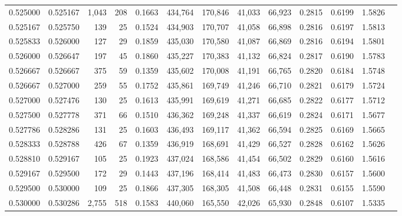 \begin{tabular}{rrrrrrrrrrrrr}
0.525000 & 0.525167 & 1,043 & 208 &                                     0.1663 & 434,764 & 170,846 &  41,033 &  66,923 & 0.2815 & 0.6199 & 1.5826 \\
0.525167 & 0.525750 &   139 &  25 &                                     0.1524 & 434,903 & 170,707 &  41,058 &  66,898 & 0.2816 & 0.6197 & 1.5813 \\
0.525833 & 0.526000 &   127 &  29 &                                     0.1859 & 435,030 & 170,580 &  41,087 &  66,869 & 0.2816 & 0.6194 & 1.5801 \\
0.526000 & 0.526647 &   197 &  45 &                                     0.1860 & 435,227 & 170,383 &  41,132 &  66,824 & 0.2817 & 0.6190 & 1.5783 \\
0.526667 & 0.526667 &   375 &  59 &                                     0.1359 & 435,602 & 170,008 &  41,191 &  66,765 & 0.2820 & 0.6184 & 1.5748 \\
0.526667 & 0.527000 &   259 &  55 &                                     0.1752 & 435,861 & 169,749 &  41,246 &  66,710 & 0.2821 & 0.6179 & 1.5724 \\
0.527000 & 0.527476 &   130 &  25 &                                     0.1613 & 435,991 & 169,619 &  41,271 &  66,685 & 0.2822 & 0.6177 & 1.5712 \\
0.527500 & 0.527778 &   371 &  66 &                                     0.1510 & 436,362 & 169,248 &  41,337 &  66,619 & 0.2824 & 0.6171 & 1.5677 \\
0.527786 & 0.528286 &   131 &  25 &                                     0.1603 & 436,493 & 169,117 &  41,362 &  66,594 & 0.2825 & 0.6169 & 1.5665 \\
0.528333 & 0.528788 &   426 &  67 &                                     0.1359 & 436,919 & 168,691 &  41,429 &  66,527 & 0.2828 & 0.6162 & 1.5626 \\
0.528810 & 0.529167 &   105 &  25 &                                     0.1923 & 437,024 & 168,586 &  41,454 &  66,502 & 0.2829 & 0.6160 & 1.5616 \\
0.529167 & 0.529500 &   172 &  29 &                                     0.1443 & 437,196 & 168,414 &  41,483 &  66,473 & 0.2830 & 0.6157 & 1.5600 \\
0.529500 & 0.530000 &   109 &  25 &                                     0.1866 & 437,305 & 168,305 &  41,508 &  66,448 & 0.2831 & 0.6155 & 1.5590 \\
0.530000 & 0.530286 & 2,755 & 518 &                                     0.1583 & 440,060 & 165,550 &  42,026 &  65,930 & 0.2848 & 0.6107 & 1.5335 \\

\end{tabular}
